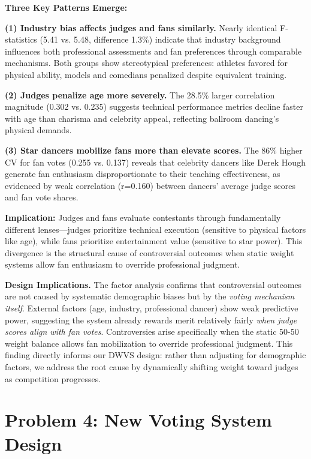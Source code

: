 \documentclass{mcmthesis}
\begin{document}
\textbf{Three Key Patterns Emerge:}

\textbf{(1) Industry bias affects judges and fans similarly.} Nearly identical F-statistics (5.41 vs. 5.48, difference 1.3\%) indicate that industry background influences both professional assessments and fan preferences through comparable mechanisms. Both groups show stereotypical preferences: athletes favored for physical ability, models and comedians penalized despite equivalent training.

\textbf{(2) Judges penalize age more severely.} The 28.5\% larger correlation magnitude (0.302 vs. 0.235) suggests technical performance metrics decline faster with age than charisma and celebrity appeal, reflecting ballroom dancing's physical demands.

\textbf{(3) Star dancers mobilize fans more than elevate scores.} The 86\% higher CV for fan votes (0.255 vs. 0.137) reveals that celebrity dancers like Derek Hough generate fan enthusiasm disproportionate to their teaching effectiveness, as evidenced by weak correlation (r=0.160) between dancers' average judge scores and fan vote shares.

\textbf{Implication:} Judges and fans evaluate contestants through fundamentally different lenses---judges prioritize technical execution (sensitive to physical factors like age), while fans prioritize entertainment value (sensitive to star power). This divergence is the structural cause of controversial outcomes when static weight systems allow fan enthusiasm to override professional judgment.

\textbf{Design Implications.} The factor analysis confirms that controversial outcomes are not caused by systematic demographic biases but by the \textit{voting mechanism itself}. External factors (age, industry, professional dancer) show weak predictive power, suggesting the system already rewards merit relatively fairly \textit{when judge scores align with fan votes}. Controversies arise specifically when the static 50-50 weight balance allows fan mobilization to override professional judgment. This finding directly informs our DWVS design: rather than adjusting for demographic factors, we address the root cause by dynamically shifting weight toward judges as competition progresses.

\section{Problem 4: New Voting System Design}
\end{document}

